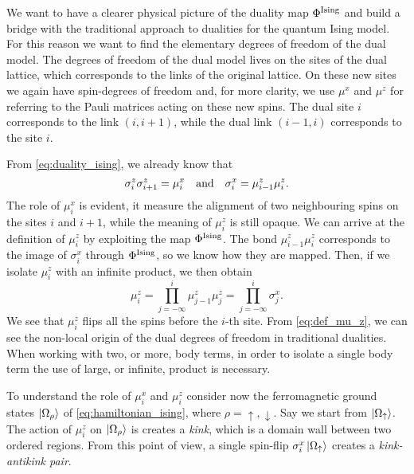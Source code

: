 \begin{figure}[t]
\end{figure}


We want to have a clearer physical picture of the duality map $\Phi^{\text{Ising}}$ and build a bridge with the traditional approach to dualities for the quantum Ising model.
For this reason we want to find the elementary degrees of freedom of the dual model.
The degrees of freedom of the dual model lives on the sites of the dual lattice, which corresponds to the links of the original lattice.
On these new sites we again have spin-\onehalf degrees of freedom and, for more clarity, we use $\mu^x$ and $\mu^z$ for referring to the Pauli matrices acting on these new spins.
The dual site $i$ corresponds to the link $(i, i+1)$, while the dual link $(i-1, i)$  corresponds to the site $i$.

From \eqref{eq:duality_ising}, we already know that
\begin{equation}
    \sigma^z_i \sigma^z_{i+1} = \mu^x_i
    \qand
    \sigma^x_i = \mu^z_{i-1} \mu^z_i.
\end{equation}
The role of $\mu^x_i$ is evident, it measure the alignment of two neighbouring spins on the sites $i$ and $i+1$, while the meaning of $\mu^z_i$ is still opaque.
We can arrive at the definition of $\mu^z_i$ by exploiting the map $\Phi^{\text{Ising}}$.
The bond $\mu^z_{i-1} \mu^z_i$ corresponds to the image of $\sigma^x_i$ through $\Phi^{\text{Ising}}$, so we know how they are mapped.
Then, if we isolate $\mu^z_i$ with an infinite product, we then obtain
\begin{equation}
    \mu^z_i
    = \prod_{j = -\infty}^{i} \mu^z_{j-1} \mu^z_j
    = \prod_{j = -\infty}^{i} \sigma^x_j.
    \label{eq:def_mu_z}
\end{equation}
We see that $\mu^z_i$ flips all the spins before the $i$-th site.
From \eqref{eq:def_mu_z}, we can see the non-local origin of the dual degrees of freedom in traditional dualities.
When working with two, or more, body terms, in order to isolate a single body term the use of large, or infinite, product is necessary.

To understand the role of $\mu^x_i$ and $\mu^z_i$ consider now the ferromagnetic ground states $\ket{\Omega_{\rho}}$ of \eqref{eq:hamiltonian_ising}, where $\rho=\uparrow, \downarrow$.
Say we start from $\ket{\Omega_{\uparrow}}$.
The action of $\mu^z_i$ on $\ket{\Omega_{\rho}}$ is creates a \emph{kink}, which is a domain wall between two ordered regions.
From this point of view, a single spin-flip $\sigma^x_i \ket{\Omega_{\uparrow}}$ creates a \emph{kink-antikink pair}.



